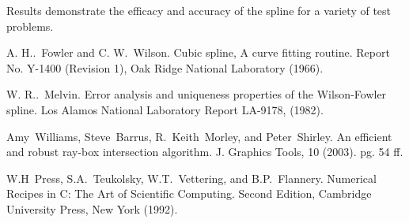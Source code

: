 Results demonstrate the efficacy and accuracy of the spline for a variety of test problems.


\begin{thebibliography}{10}

{\sc A. H..~Fowler and C. W.~Wilson}. {Cubic spline, A curve fitting routine}. Report No. Y-1400 (Revision 1),
Oak Ridge National Laboratory (1966).

{\sc W. R..~Melvin}. {Error analysis and uniqueness properties of the Wilson-Fowler spline}. Los Alamos National Laboratory Report LA-9178, (1982).

{\sc Amy~Williams, Steve~Barrus, R.~Keith~Morley, and Peter~Shirley}. {An efficient and robust ray-box intersection algorithm}. J. Graphics Tools, 10 (2003). pg. 54 ff.

{\sc W.H~Press, S.A.~Teukolsky, W.T.~Vettering, and B.P.~Flannery}. {Numerical Recipes in C: The Art of Scientific Computing}. Second Edition, Cambridge University Press, New York (1992).

\end{thebibliography}